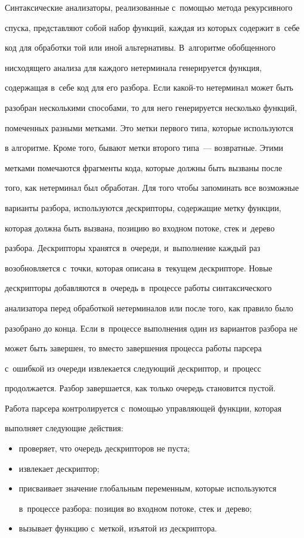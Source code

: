 Синтаксические анализаторы, реализованные с~помощью метода рекурсивного


спуска, представляют собой набор функций, каждая из которых содержит в~себе


код для обработки той или иной альтернативы. В~алгоритме обобщенного


нисходящего анализа для каждого нетерминала генерируется функция,


содержащая в~себе код для его разбора. Если какой-то нетерминал может быть


разобран несколькими способами, то для него генерируется несколько функций,


помеченных разными метками. Это метки первого типа, которые используются


в алгоритме. Кроме того, бывают метки второго типа~--- возвратные. Этими


метками помечаются фрагменты кода, которые должны быть вызваны после


того, как нетерминал был обработан. Для того чтобы запоминать все возможные


варианты разбора, используются дескрипторы, содержащие метку функции,


которая должна быть вызвана, позицию во входном потоке, стек и~дерево


разбора. Дескрипторы хранятся в~очереди, и~выполнение каждый раз


возобновляется с~точки, которая описана в~текущем дескрипторе. Новые


дескрипторы добавляются в~очередь в~процессе работы синтаксического


анализатора перед обработкой нетерминалов или после того, как правило было


разобрано до конца. Если в~процессе выполнения один из вариантов разбора не


может быть завершен, то вместо завершения процесса работы парсера


с~ошибкой из очереди извлекается следующий дескриптор, и~процесс


продолжается. Разбор завершается, как только очередь становится пустой.


Работа парсера контролируется с~помощью управляющей функции, которая


выполняет следующие действия:


\begin{itemize}


\item проверяет, что очередь дескрипторов не пуста;


\item извлекает дескриптор;


\item присваивает значение глобальным переменным, которые используются


в~процессе разбора: позиция во входном потоке, стек и~дерево;


\item вызывает функцию с~меткой, изъятой из дескриптора.


\end{itemize}





